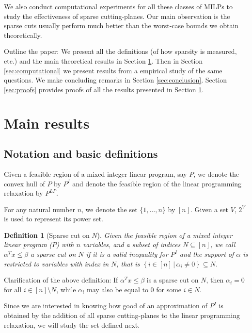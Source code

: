 \documentclass[smallextended]{svjour3}
\newtheorem{definition}[proposition]{Definition}
\begin{document}
We also conduct computational experiments for all these classes of MILPs to study the effectiveness of sparse cutting-planes. Our main observation is the sparse cuts usually perform much better than the worst-case bounds we obtain theoretically. 

Outline the paper: We present all the definitions (of how sparsity is measured, etc.) and the main theoretical results in Section \ref{sec:main}. Then in Section \ref{sec:computational} we present results from a empirical study of the same questions. We make concluding remarks in Section \ref{sec:conclusion}. Section \ref{sec:proofs} provides proofs of all the results presented in Section \ref{sec:main}.

\section{Main results}\label{sec:main}

\subsection {Notation and basic definitions} \label{sec:def}
Given a feasible region of a mixed integer linear program, say $P$, we denote the convex hull of $P$ by $P^I$ and denote the feasible region of the linear programming relaxation by $P^{LP}$. 

For any natural number $n$, we denote the set $\{1, \dots, n\}$ by $[n]$. Given a set $V$, $2^{V}$ is used to represent its power set.

\begin{definition}[Sparse cut on $N$]
Given the feasible region of a mixed integer linear program ($P$) with $n$ variables, and a subset of indices $N \subseteq [n]$, we call $\alpha^Tx \leq \beta$ \emph{a sparse cut on $N$} if it is a valid inequality for $P^I$ and the support of $\alpha$ is restricted to variables with index in $N$, that is $\left\{i \in [n]\,|\,\alpha_i \neq 0 \right\} \subseteq N$.
\end{definition}
Clarification of the above definition: If $\alpha^T x \leq \beta$ is a sparse cut on $N$, then $\alpha_i = 0$ for all $i \in [n]\setminus N$, while $\alpha_i$ may also be equal to $0$ for some $i \in N$.

Since we are interested in knowing how good of an approximation of $P^I$ is obtained by the addition of all sparse cutting-planes to the linear programming relaxation, we will study the set defined next.	
\end{document}
